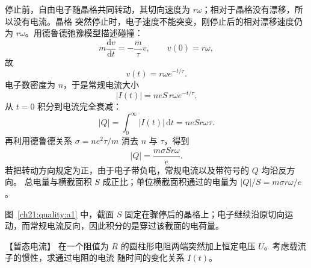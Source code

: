 {\begin{xesolution}
\par\noindent\begin{minipage}{\linewidth}
\tolmanRingFigure
{}
\end{minipage}\par\medskip


停止前，自由电子随晶格共同转动，其切向速度为 $r\omega$；相对于晶格没有漂移，所以没有电流。晶格
突然停止时，电子速度不能突变，刚停止后的相对漂移速度仍为 $r\omega$。用德鲁德弛豫模型描述碰撞：
\[
  m\frac{\mathrm dv}{\mathrm dt}=-\frac m\tau v,
  \qquad v(0)=r\omega,
\]
故
\[
  v(t)=r\omega e^{-t/\tau}.
\]
电子数密度为 $n$，于是常规电流大小
\[
  |I(t)|=neS\,r\omega e^{-t/\tau}.
\]
从 $t=0$ 积分到电流完全衰减：
\[
  |Q|=\int_0^\infty |I(t)|\,\mathrm dt=neSr\omega\tau.
\]
再利用德鲁德关系 $\sigma=ne^2\tau/m$ 消去 $n$ 与 $\tau$，得到
\[
  \boxed{|Q|=\frac{m\sigma S r\omega}{e}}.
\]
若把转动方向规定为正，由于电子带负电，常规电流以及带符号的 $Q$ 均沿反方向。
总电量与横截面积 $S$ 成正比；单位横截面积通过的电量为
$|Q|/S=m\sigma r\omega/e$。

图~\ref{ch21:quality:a1} 中，截面 $S$ 固定在骤停后的晶格上；电子继续沿原切向运动，而常规电流反向，因此积分的是穿过该截面的电荷量。
\end{xesolution}



\begin{origexamplebox}{【暂态电流】}\label{ch21:ex:s36-5-2}
在一个阻值为 $R$ 的圆柱形电阻两端突然加上恒定电压 $U$。考虑载流子的惯性，求通过电阻的电流
随时间的变化关系 $I(t)$。

\begin{center}\begin{minipage}{.96\linewidth}\centering
{}
\end{minipage}\end{center}
\end{origexamplebox}\par\nopagebreak[4]

}
